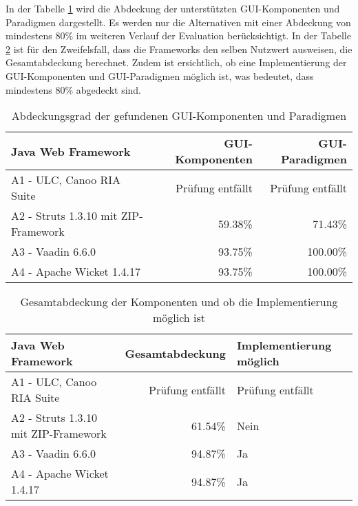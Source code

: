 In der Tabelle \ref{tab:unterstuetztungDerKomponenten} wird die Abdeckung der
unterstützten GUI-Komponenten und Paradigmen dargestellt. Es werden nur die
Alternativen mit einer Abdeckung von mindestens 80\% im weiteren
Verlauf der Evaluation berücksichtigt. In der Tabelle
\ref{tab:gesamtabdeckungUndObImplementierungMoeglichIst} ist für den
Zweifelsfall, dass die Frameworks den selben Nutzwert ausweisen, die
Gesamtabdeckung berechnet. Zudem ist ersichtlich, ob eine Implementierung der
GUI-Komponenten und GUI-Paradigmen möglich ist, was bedeutet, dass mindestens
80\% abgedeckt sind.

\begin{table}[!h]
  \sffamily 
  \begin{center}
    \begin{tabular}{lrr}
      \toprule
      \textbf{Java Web Framework} & \textbf{GUI-Komponenten} &
      \textbf{GUI-Paradigmen} \\
      \midrule
      A1 - ULC, Canoo RIA Suite & Prüfung entfällt & Prüfung entfällt\\
      A2 - Struts 1.3.10 mit ZIP-Framework & 59.38\% & 71.43\%\\
      A3 - Vaadin 6.6.0 & 93.75\% & 100.00\%\\
      A4 - Apache Wicket 1.4.17 & 93.75\% & 100.00\%\\
      \bottomrule
    \end{tabular}
    \caption{Abdeckungsgrad der gefundenen GUI-Komponenten und Paradigmen}
    \label{tab:unterstuetztungDerKomponenten}
  \end{center}
\end{table}

\begin{table}[!h]
  \sffamily 
  \begin{center}
    \begin{tabular}{lrp{3cm}}
      \toprule
      \textbf{Java Web Framework} & \textbf{Gesamtabdeckung} &
      \textbf{Implementierung möglich}\\
      \midrule
      A1 - ULC, Canoo RIA Suite & Prüfung entfällt & Prüfung entfällt\\
      A2 - Struts 1.3.10 mit ZIP-Framework & 61.54\% & Nein\\
      A3 - Vaadin 6.6.0 & 94.87\% & Ja\\
      A4 - Apache Wicket 1.4.17 & 94.87\% & Ja\\
      \bottomrule
    \end{tabular}
    \caption{Gesamtabdeckung der Komponenten und ob die Implementierung möglich
    ist}
    \label{tab:gesamtabdeckungUndObImplementierungMoeglichIst}
  \end{center}
\end{table}